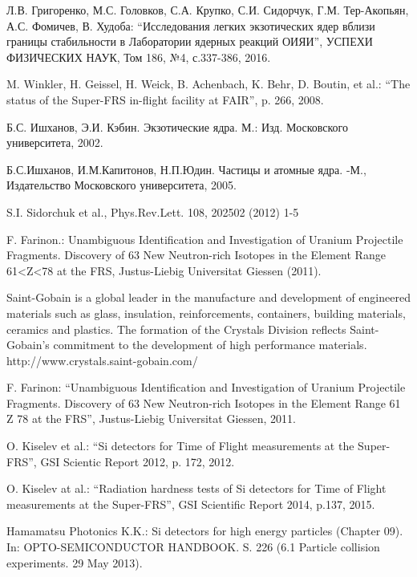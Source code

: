 \newpage
\begin{thebibliography}{999}
	
	Л.В. Григоренко, М.С. Головков, С.А. Крупко, С.И. Сидорчук, Г.М. Тер-Акопьян, А.С. Фомичев, В. Худоба: ``Исследования легких экзотических ядер вблизи границы стабильности в Лаборатории ядерных реакций ОИЯИ'', УСПЕХИ ФИЗИЧЕСКИХ НАУК, Том 186, №4, с.337-386, 2016.
	
	M. Winkler, H. Geissel, H. Weick, B. Achenbach, K. Behr, D. Boutin, et al.:
	``The status of the Super-FRS in-flight facility at FAIR'', p. 266, 2008.
	
	Б.С. Ишханов, Э.И. Кэбин. Экзотические ядра. М.: Изд. Московского университета, 2002.
	
	Б.С.Ишханов, И.М.Капитонов, Н.П.Юдин. Частицы и атомные ядра. -М., Издательство Московского университета, 2005.
	
	S.I. Sidorchuk et al., Phys.Rev.Lett. 108, 202502 (2012) 1-5
	
	F. Farinon.: Unambiguous Identification and Investigation of Uranium Projectile Fragments. Discovery of 63 New Neutron-rich Isotopes in the Element Range 61<Z<78 at the FRS, Justus-Liebig Universitat Giessen (2011).
	
	Saint-Gobain is a global leader in the manufacture and development of engineered materials such as glass, insulation, reinforcements, containers, building materials, ceramics and plastics.
	The formation of the Crystals Division reflects Saint-Gobain’s commitment to the development of high performance materials. 
	http://www.crystals.saint-gobain.com/	
	
	F. Farinon: ``Unambiguous Identification and Investigation of Uranium Projectile Fragments. Discovery of 63 New Neutron-rich Isotopes in the Element Range 61  Z  78 at the FRS'', Justus-Liebig Universitat Giessen, 2011.
	
	O. Kiselev et al.: ``Si detectors for Time of Flight measurements at the Super-FRS'', GSI Scientic Report 2012, p. 172, 2012.
	
	O. Kiselev at al.: ``Radiation hardness tests of Si detectors for Time of Flight measurements at the Super-FRS'', GSI Scientific Report 2014, p.137, 2015.
		
	Hamamatsu Photonics K.K.: Si detectors for high energy particles (Chapter 09). In: OPTO-SEMICONDUCTOR HANDBOOK. S. 226 (6.1 Particle collision experiments. 29 May 2013).
	

\end{thebibliography}
